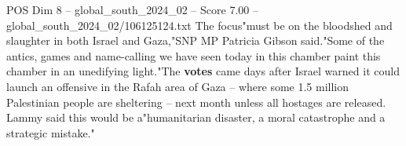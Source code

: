 \begin{textsample}{POS Dim 8 – global\_south\_2024\_02 – Score 7.00 – global\_south\_2024\_02/106125124.txt}
The focus"must be on the bloodshed and slaughter in both Israel and Gaza,"SNP MP Patricia Gibson said."Some of the antics, games and name-calling we have seen today in this chamber paint this chamber in an unedifying light."The \textbf{votes} came days after Israel warned it could launch an offensive in the Rafah area of Gaza -- where some 1.5 million Palestinian people are sheltering -- next month unless all hostages are released.
Lammy said this would be a"humanitarian disaster, a moral catastrophe and a strategic mistake."

\end{textsample}
